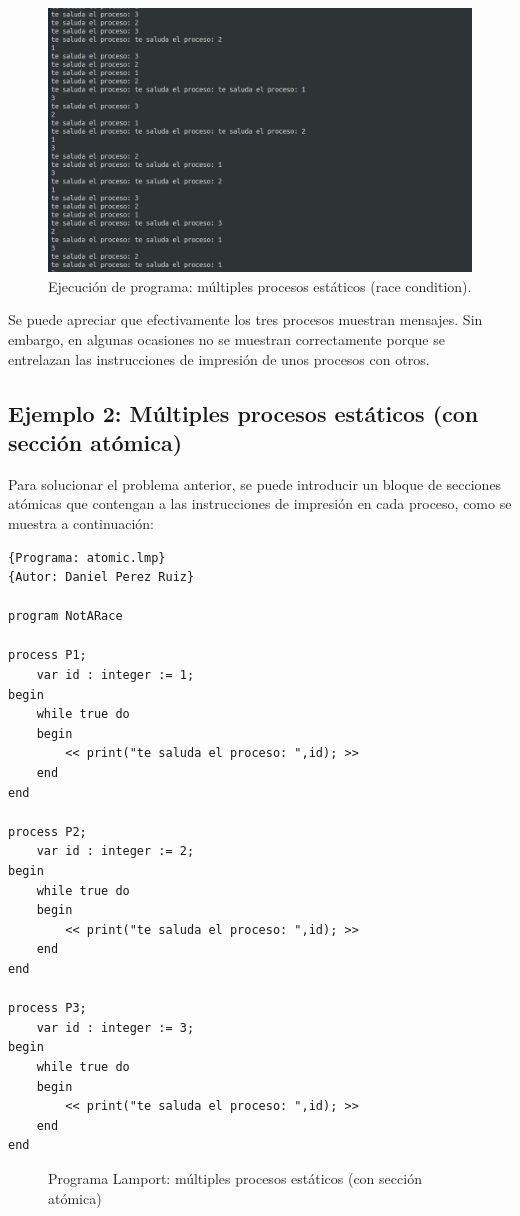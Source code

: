 \begin{figure}[h]
    \includegraphics[width=\linewidth]{images/ejemplos/concurrentes/multiple_process.png}
    \caption{Ejecución de programa: múltiples procesos estáticos (race condition).}
    \label{fig:lamportMultipleProcess_exec}
\end{figure}

Se puede apreciar que efectivamente los tres procesos muestran mensajes. Sin embargo, en algunas ocasiones no se muestran correctamente porque se entrelazan las instrucciones de impresión de unos procesos con otros.

\newpage

\subsection{Ejemplo 2: Múltiples procesos estáticos (con sección atómica)}
Para solucionar el problema anterior, se puede introducir un bloque de secciones atómicas que contengan a las instrucciones de impresión en cada proceso, como se muestra a continuación:
\begin{lstlisting}[style=lamportStyle]
{Programa: atomic.lmp}
{Autor: Daniel Perez Ruiz}

program NotARace

process P1;
	var id : integer := 1;
begin
	while true do
	begin
		<< print("te saluda el proceso: ",id); >>
	end
end

process P2;
	var id : integer := 2;
begin
	while true do
	begin
		<< print("te saluda el proceso: ",id); >>
	end
end

process P3;
	var id : integer := 3;
begin
	while true do
	begin
		<< print("te saluda el proceso: ",id); >>
	end
end
\end{lstlisting}
\begin{figure}[h]
\caption{Programa Lamport: múltiples procesos estáticos (con sección atómica)}
\label{fig:lamportMultipleProcessAtomic}
\end{figure}

